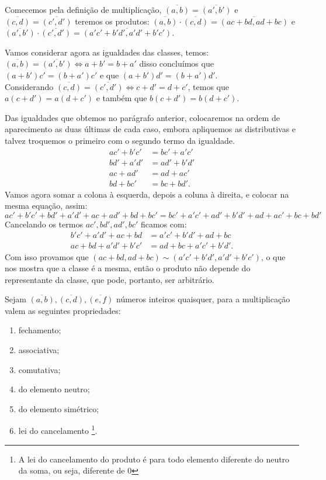 \documentclass[../main.tex]{subfiles}
\begin{document}
\begin{dem}
    Comecemos pela definição de multiplicação, $\overline{(a,b)} = \overline{(a',b')}$ e $\overline{(c,d)} = \overline{(c',d')}$ teremos os produtos:
    $\overline{(a,b)} \cdot \overline{(c,d)} = \overline{(ac+bd,ad+bc)}$ e $\overline{(a',b')} \cdot \overline{(c',d')} = \overline{(a'c'+b'd',a'd'+b'c')}$.
    
    Vamos considerar agora as igualdades das classes, temos: \\
        $\overline{(a,b)} = \overline{(a',b')} \iff a + b' = b + a' $ disso concluímos que 
        $ (a + b')c' = (b + a')c'$ e que $(a + b')d' = (b + a')d'$. \\
    Considerando $\overline{(c,d)} = \overline{(c',d')} \iff c + d' = d + c' $, temos que
    $a(c + d') = a(d + c')$ e também que $b(c + d') = b(d + c')$.
    
    Das igualdades que obtemos no parágrafo anterior, colocaremos na ordem de aparecimento as duas últimas de cada caso, embora apliquemos as distributivas e talvez troquemos o primeiro com o segundo termo da igualdade.
    \begin{align*}
        ac'+b'c' &= bc'+a'c' \\
        bd'+a'd' &= ad'+b'd' \\
        ac+ad'   &= ad+ac' \\
        bd+bc'   &= bc+bd'.
    \end{align*}
    Vamos agora somar a colona à esquerda, depois a coluna à direita, e colocar na mesma equação, assim:
    $$ac'+b'c' + bd'+a'd' + ac+ad' + bd+bc' = bc'+a'c' + ad'+b'd' + ad+ac' + bc+bd'$$
    Cancelando os termos $ac', bd', ad', bc'$ ficamos com:
    \begin{align*}
        b'c' +a'd' + ac + bd  &= a'c' + b'd' + ad+ bc \\
        ac + bd + a'd' + b'c' &= ad + bc + a'c' + b'd'.
    \end{align*}
    Com isso provamos que $ (ac+bd,ad+bc) \sim (a'c'+b'd',a'd'+b'c')$, o que nos mostra que a classe é a mesma, então o produto não depende do representante da classe, que pode, portanto, ser arbitrário.
\end{dem}
\begin{prop}{Sejam $\overline{(a,b)}, \overline{(c,d)}, \overline{(e,f)}$ números inteiros quaisquer, para a multiplicação valem as seguintes propriedades:}
    \begin{enumerate}[label=(\roman*)]
        \item fechamento;
        \item associativa;
        \item comutativa;
        \item do elemento neutro; 
        \item do elemento simétrico;
        \item lei do cancelamento \footnote{A lei do cancelamento do produto é para todo elemento diferente do neutro da soma, ou seja, diferente de $0$}.
    \end{enumerate}
\end{prop}
\end{document}
